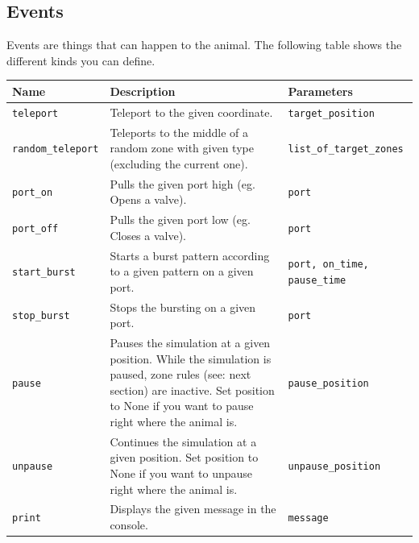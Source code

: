 \documentclass[11pt,a4paper]{article}
\begin{document}
\nocite{When specifying the parameters of a frame, always name the arguments (as seen above).}

\subsection{Events}
Events are things that can happen to the animal. The following table shows the different kinds you
can define.\\


\begin{tabularx}{\textwidth}{|p{3.1cm}|X|p{4cm}|}
\hline 
\rule[-1ex]{0pt}{2.5ex} 
\textbf{Name} & \textbf{Description} & \textbf{Parameters} \\ 

\hline 
\rule[-1ex]{0pt}{2.5ex} 
\texttt{teleport} & Teleport to the given coordinate. & \texttt{target\_position} \\ 

\hline 
\rule[-1ex]{0pt}{2.5ex} 
\texttt{random\_teleport} & Teleports to the middle of a random zone with given type (excluding the current one). & \texttt{list\_of\_target\_zones} \\ 

\hline 
\rule[-1ex]{0pt}{2.5ex} 
\texttt{port\_on} & Pulls the given port high
(eg. Opens a valve). & \texttt{port} \\ 

\hline 
\rule[-1ex]{0pt}{2.5ex} \texttt{port\_off} & Pulls the given port low (eg. Closes a valve). & \texttt{port} \\ 

\hline 
\rule[-1ex]{0pt}{2.5ex} 
\texttt{start\_burst} & Starts a burst pattern according to a given pattern on a given port. & \texttt{port, on\_time, pause\_time} \\ 

\hline 
\rule[-1ex]{0pt}{2.5ex} 
\texttt{stop\_burst} & Stops the bursting on a given port. & \texttt{port} \\ 

\hline 
\rule[-1ex]{0pt}{2.5ex} 
\texttt{pause} & Pauses the simulation at a given position. While the simulation is paused, zone rules (see: next section) are inactive. Set position to None if you want to pause right where the animal is. & \texttt{pause\_position} \\ 

\hline 
\rule[-1ex]{0pt}{2.5ex} 
\texttt{unpause} & Continues the simulation at a given position. Set position to None if you want to unpause right where the animal is. & \texttt{unpause\_position} \\ 

\hline 
\rule[-1ex]{0pt}{2.5ex} 
\texttt{print} & Displays the given message in the console. & \texttt{message} \\ 

\hline 
\end{tabularx} 
\end{document}
